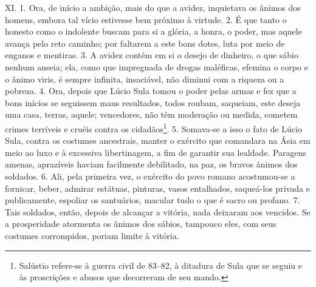 XI. 1. Ora, de início a ambição, mais do que a avidez, inquietava os ânimos dos
homens, embora tal vício estivesse bem próximo à virtude. 2. É que tanto o
honesto como o indolente buscam para si a glória, a honra, o poder, mas aquele
avança pelo reto caminho; por faltarem a este bons dotes, luta por meio de
enganos e mentiras. 3. A avidez contém em si o desejo de dinheiro, o que sábio
nenhum anseia; ela, como que impregnada de drogas maléficas, efemina o corpo e
o ânimo viris, é sempre infinita, insaciável, não diminui com a riqueza ou a
pobreza. 4. Ora, depois que Lúcio Sula tomou o poder pelas armas e fez que a
bons inícios se seguissem maus resultados, todos roubam, saqueiam, este deseja
uma casa, terras, aquele; vencedores, não têm moderação ou medida, cometem
crimes terríveis e cruéis contra os cidadãos\footnote{Salústio refere-se à
guerra civil de 83--82, à ditadura de Sula que se seguiu e às proscrições e
abusos que decorreram de seu mando.}. 5. Somava-se a isso o fato de Lúcio Sula,
contra os costumes ancestrais, manter o exército que comandara na Ásia em meio
ao luxo e à excessiva libertinagem, a fim de garantir sua lealdade. Paragens
amenas, aprazíveis haviam facilmente debilitado, na paz, os bravos ânimos dos
soldados. 6. Ali, pela primeira vez, o exército do povo romano acostumou-se a
fornicar, beber, admirar estátuas, pinturas, vasos entalhados, saqueá-los
privada e publicamente, espoliar os santuários, macular tudo o que é sacro ou
profano. 7. Tais soldados, então, depois de alcançar a vitória, nada deixaram
aos vencidos. Se a prosperidade atormenta os ânimos dos sábios, tampouco eles,
com seus costumes corrompidos, poriam limite à vitória.

